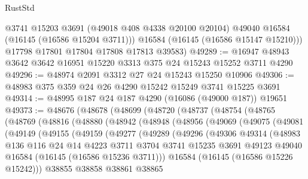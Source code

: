 \begin{lexlean}{RustStd}
\begin{coremodule}
          @3741
          @15203
          @3691
          (@49018 @408 @4338 @20100 @20104)
          @49040
          @16584
          (@16145 (@16586 @15204 @3711)))
        @16584
        (@16145 (@16586 @15147 @15210)))
      @17798
      @17801
      @17804
      @17808
      @17813
      @39583)
@49289 := @16947 @48943 @3642 @3642 @16951 @15220 @3313 @375 @24 @15243 @15252 @3711 @4290
@49296 := @48974 @2091 @3312 @27 @24 @15243 @15250 @10906
@49306 := @48983 @375 @359 @24 @26 @4290 @15242 @15249 @3741 @15225 @3691
@49314 := @48995 @187 @24 @187 @4290 (@16086 (@49000 @187)) @19651
@49373 := @48676
    (@48678
      (@48699
        (@48720
          (@48737
            (@48754
              (@48765
                (@48769
                  (@48816
                    (@48880
                      (@48942
                        (@48948
                          (@48956
                            (@49069
                              (@49075
                                (@49081
                                  (@49149
                                    (@49155
                                      (@49159
                                        (@49277
                                          (@49289
                                            (@49296
                                              (@49306
                                                @49314
                                                (@48983
                                                  @136
                                                  @116
                                                  @24
                                                  @14
                                                  @4223
                                                  @3711
                                                  @3704
                                                  @3741
                                                  @15235
                                                  @3691
                                                  @49123
                                                  @49040
                                                  @16584
                                                  (@16145 (@16586 @15236 @3711)))
                                                @16584
                                                (@16145 (@16586 @15226 @15242)))
                                              @38855
                                              @38858
                                              @38861
                                              @38865

\end{coremodule}
\end{lexlean}

